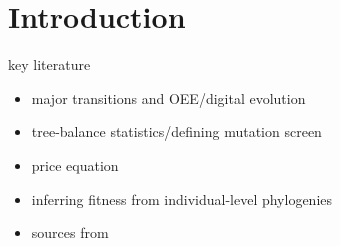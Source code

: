 \section{Introduction} \label{sec:introduction}

key literature
\begin{itemize}
\item major transitions and OEE/digital evolution \citep{vostinar2021symbulation,dolson2019modes,dolson2024what,moreno2019toward}
\item tree-balance statistics/defining mutation screen \citep{BonettiFranceschi2024phylogenetic}
\item price equation \citep{price1972fishers}
\item inferring fitness from individual-level phylogenies \citep{nozoe2017inferring,kuo2025bayesian}
\item sources from \citep{moreno2024ecology}
\end{itemize}
